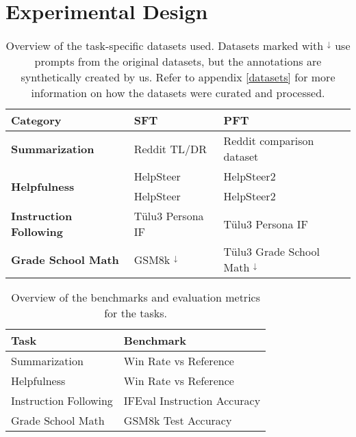 \section{Experimental Design}



\begin{table*}[!ht]
\centering
\small{
\begin{tabular}{@{}p{} p{} p{}@{}}
\toprule
\textbf{Category} & \textbf{SFT} & \textbf{PFT} \\ 
\midrule
\textbf{Summarization} & Reddit TL/DR \cite{volske-etal-2017-tl} & Reddit comparison dataset \cite{stienon2020learning} \\ 
\midrule
\multirow{2}{*}{\textbf{Helpfulness}} 
    & HelpSteer \cite{wang2023helpsteer} & HelpSteer2 \cite{wang2024helpsteer2} \\ 
    & HelpSteer \cite{wang2023helpsteer} & HelpSteer2 \cite{wang2024helpsteer2} \\ 
\midrule
\textbf{Instruction Following} 
    & Tülu3 Persona IF \cite{lambert2025tulu3pushingfrontiers} & Tülu3 Persona IF \cite{lambert2025tulu3pushingfrontiers} \\ 
\midrule
\textbf{Grade School Math} 
    & GSM8k \citep{cobbe2021training} $^{\downarrow}$ & Tülu3 Grade School Math \cite{lambert2025tulu3pushingfrontiers} $^{\downarrow}$\\ 
\bottomrule
\end{tabular}
}
\caption{Overview of the task-specific datasets used. Datasets marked with $^{\downarrow}$ use prompts from the original datasets, but the annotations are synthetically created by us. Refer to appendix \ref{datasets} for more information on how the datasets were curated and processed. }
\label{tab:datasets_tasks}
\end{table*}

\begin{table}[!ht]
\centering
\small{
\begin{tabular}{@{}p{} p{}@{}}
\toprule
\textbf{Task} & \textbf{Benchmark} \\ 
\midrule
Summarization & Win Rate vs Reference \\ 
\midrule
Helpfulness & Win Rate vs Reference \\ 
\midrule
Instruction Following & IFEval Instruction Accuracy \cite{zhou2023instruction} \\ 
\midrule
Grade School Math & GSM8k Test Accuracy \\ 
\bottomrule
\end{tabular}
}
\caption{Overview of the benchmarks and evaluation metrics for the tasks.}
\label{tab:tasks_benchmarks}
\end{table}



